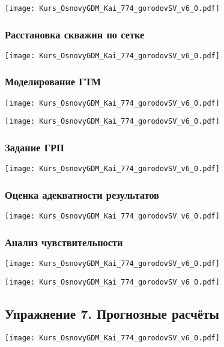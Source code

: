 \documentclass[main.tex]{subfiles}
\begin{document}
\texttt{[image: Kurs\_OsnovyGDM\_Kai\_774\_gorodovSV\_v6\_0.pdf]}

\subsubsection{Расстановка скважин по сетке}

\texttt{[image: Kurs\_OsnovyGDM\_Kai\_774\_gorodovSV\_v6\_0.pdf]}

\subsubsection{Моделирование ГТМ}

\texttt{[image: Kurs\_OsnovyGDM\_Kai\_774\_gorodovSV\_v6\_0.pdf]}

\texttt{[image: Kurs\_OsnovyGDM\_Kai\_774\_gorodovSV\_v6\_0.pdf]}

\subsubsection{Задание ГРП}

\texttt{[image: Kurs\_OsnovyGDM\_Kai\_774\_gorodovSV\_v6\_0.pdf]}

\subsubsection{Оценка адекватности результатов}

\texttt{[image: Kurs\_OsnovyGDM\_Kai\_774\_gorodovSV\_v6\_0.pdf]}

\subsubsection{Анализ чувствительности}

\texttt{[image: Kurs\_OsnovyGDM\_Kai\_774\_gorodovSV\_v6\_0.pdf]}

\texttt{[image: Kurs\_OsnovyGDM\_Kai\_774\_gorodovSV\_v6\_0.pdf]}

\subsection{Упражнение 7. Прогнозные расчёты}

\texttt{[image: Kurs\_OsnovyGDM\_Kai\_774\_gorodovSV\_v6\_0.pdf]}
\end{document}

